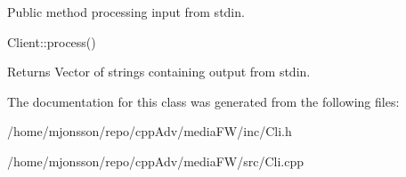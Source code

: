 Public method processing input from stdin. 

Client\+::process() \begin{DoxyReturn}{Returns}
Vector of strings containing output from stdin. 
\end{DoxyReturn}


The documentation for this class was generated from the following files\+:\begin{DoxyCompactItemize}
\item 
/home/mjonsson/repo/cpp\+Adv/media\+F\+W/inc/Cli.\+h\item 
/home/mjonsson/repo/cpp\+Adv/media\+F\+W/src/Cli.\+cpp\end{DoxyCompactItemize}
